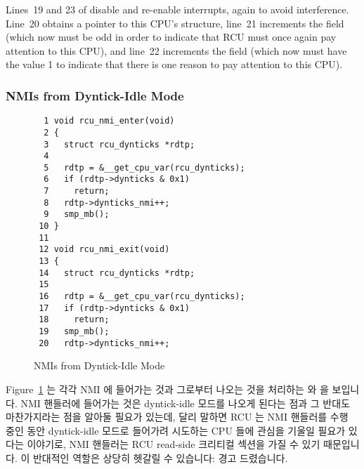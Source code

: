 Lines~19 and 23 of  disable and re-enable interrupts,
again to avoid interference.
Line~20 obtains a pointer to this CPU's  structure,
line~21 increments the  field (which now must be odd
in order to indicate that RCU must once again pay attention to this
CPU), and line~22 increments the  field
(which now must have the value 1 to indicate that there is one
reason to pay attention to this CPU).
\fi

\subsubsection{NMIs from Dyntick-Idle Mode}
\label{app:rcuimpl:rcutreewt:NMIs from Dyntick-Idle Mode}

\begin{figure}[tbp]
{ \scriptsize
\begin{verbatim}
  1 void rcu_nmi_enter(void)
  2 {
  3   struct rcu_dynticks *rdtp;
  4
  5   rdtp = &__get_cpu_var(rcu_dynticks);
  6   if (rdtp->dynticks & 0x1)
  7     return;
  8   rdtp->dynticks_nmi++;
  9   smp_mb();
 10 }
 11
 12 void rcu_nmi_exit(void)
 13 {
 14   struct rcu_dynticks *rdtp;
 15
 16   rdtp = &__get_cpu_var(rcu_dynticks);
 17   if (rdtp->dynticks & 0x1)
 18     return;
 19   smp_mb();
 20   rdtp->dynticks_nmi++;
\end{verbatim}
}
\caption{NMIs from Dyntick-Idle Mode}
\label{fig:app:rcuimpl:rcutreewt:NMIs from Dyntick-Idle Mode}
\end{figure}

Figure~\ref{fig:app:rcuimpl:rcutreewt:NMIs from Dyntick-Idle Mode}
는 각각 NMI 에 들어가는 것과 그로부터 나오는 것을 처리하는 
와  을 보입니다.
NMI 핸들러에 들어가는 것은 dyntick-idle 모드를 나오게 된다는 점과 그 반대도
마찬가지라는 점을 알아둘 필요가 있는데, 달리 말하면 RCU 는 NMI 핸들러를 수행
중인 동안 dyntick-idle 모드로 들어가려 시도하는 CPU 들에 관심을 기울일 필요가
있다는 이야기로, NMI 핸들러는 RCU read-side 크리티컬 섹션을 가질 수 있기
때문입니다.
이 반대적인 역할은 상당히 헷갈릴 수 있습니다: 경고 드렸습니다.
\iffalse

Figure~\ref{fig:app:rcuimpl:rcutreewt:NMIs from Dyntick-Idle Mode}
shows \co{rcu_nmi_enter()} and \co{rcu_nmi_exit()}, which handle
NMI entry and exit, respectively.
It is important to keep in mind that entering an NMI handler
exits dyntick-idle mode and vice versa, in other words, RCU must
pay attention to CPUs that claim to be in dyntick-idle mode while
they are executing NMI handlers, due to the fact that NMI handlers
can contain RCU read-side critical sections.
This reversal of roles can be quite confusing: you have been warned.
\fi

